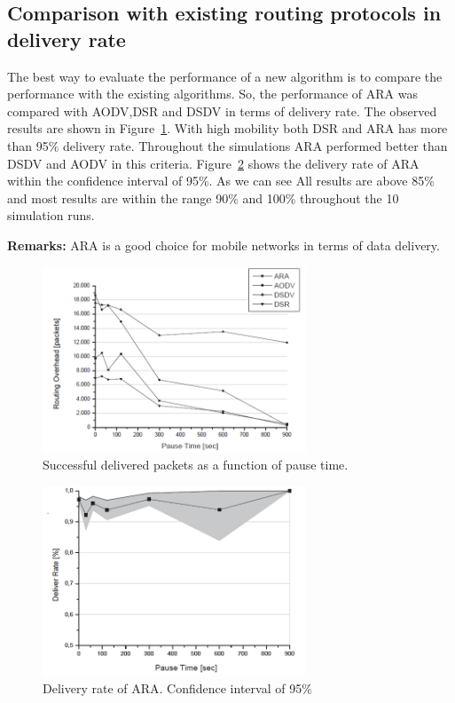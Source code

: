 \subsection{Comparison with existing routing protocols in delivery rate}
The best way to evaluate the performance of a new algorithm is to compare the performance with the existing algorithms. So, the performance of ARA was compared with AODV,DSR and DSDV in terms of delivery rate. The observed results are shown in Figure~\ref{fig:picture1}. With high mobility both DSR and ARA has more than 95\% delivery rate. 
Throughout the simulations ARA performed better than DSDV and AODV in this criteria. Figure~\ref{fig:picture2} shows the delivery rate of ARA within the confidence interval of 95\%. As we can see All results are above 85\% and most results are within the range 90\% and 100\% throughout the 10 simulation runs.

\textbf{Remarks:} ARA is a good choice for mobile networks in terms of data delivery. 

\begin{figure}[t!]
\centering
\includegraphics[width=0.7\textwidth]{Picture1.png}
\caption{\label{fig:picture1}Successful delivered packets as a
function of pause time.}
\end{figure}


\begin{figure}[t!]
\centering
\includegraphics[width=0.7\textwidth]{Picture2.png}
\caption{\label{fig:picture2}Delivery rate of ARA. Confidence interval of 95\%}
\end{figure}



